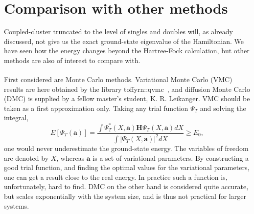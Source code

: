 \section{Comparison with other methods}
Coupled-cluster truncated to the level of singles and doubles will, as already discussed, not give us the exact ground-state eigenvalue of the Hamiltonian.
We have seen how the energy changes beyond the Hartree-Fock calculation, but other methods are also of interest to compare with.

\paragraph{}
First considered are Monte Carlo methods.
Variational Monte Carlo (VMC) results are here obtained by the library toffyrn::qvmc~\cite{toffyrn::qvmc}, and diffusion Monte Carlo (DMC) is supplied by a fellow master's student, K. R. Leikanger.
VMC should be taken as a first approximation only.
Taking any trial function $\Psi_T$ and solving the integral,
\begin{equation}
 E\left[ \Psi_T(\mathbf{a}) \right] = \frac{\int \Psi_T^*(X,\mathbf{a}) \mathbf{H}\Psi_T(X,\mathbf{a})dX}{\int \left| \Psi_T(X,\mathbf{a}) \right|^2dX} \geq E_{0},
 \end{equation}
one would never underestimate the ground-state energy.
The variables of freedom are denoted by $X$, whereas $\mathbf{a}$ is a set of variational parameters.
By constructing a good trial function, and finding the optimal values for the variational parameters, one can get a result close to the real energy.
In practice such a function is, unfortunately, hard to find.
DMC on the other hand is considered quite accurate, but scales exponentially with the system size, and is thus not practical for larger systems.

